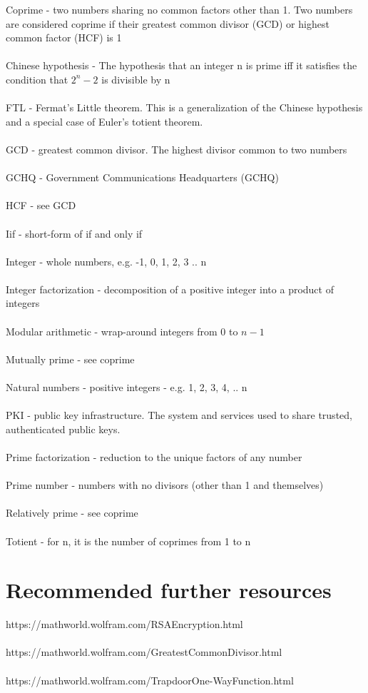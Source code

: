 \documentclass[11pt]{article}   	%
\begin{document}
Coprime - two numbers sharing no common factors other than 1. Two numbers are considered coprime if their greatest common divisor (GCD) or highest common factor (HCF) is 1 \\
\\
Chinese hypothesis - The hypothesis that an integer n is prime iff it satisfies the condition that $ 2^n - 2 $ is divisible by n \\
\\
FTL - Fermat's Little theorem. This is a generalization of the Chinese hypothesis and a special case of Euler's totient theorem. \\
\\
GCD - greatest common divisor. The highest divisor common to two numbers \\
\\
GCHQ - Government Communications Headquarters (GCHQ) \\
\\
HCF - see GCD \\
\\
Iif - short-form of if and only if \\
\\
Integer - whole numbers, e.g. -1, 0, 1, 2, 3 .. n \\
\\
Integer factorization - decomposition of a positive integer into a product of integers \\
\\
Modular arithmetic - wrap-around integers from 0 to $ n - 1 $ \\
\\
Mutually prime - see coprime \\
\\
Natural numbers - positive integers - e.g. 1, 2, 3, 4, .. n \\
\\
PKI - public key infrastructure. The system and services used to share trusted, authenticated public keys. \\
\\
Prime factorization - reduction to the unique factors of any number \\
\\
Prime number - numbers with no divisors (other than 1 and themselves) \\
\\
Relatively prime - see coprime \\
\\
Totient - for n, it is the number of coprimes from 1 to n \\

\break


\section*{Recommended further resources}

https://mathworld.wolfram.com/RSAEncryption.html \\
\\
https://mathworld.wolfram.com/GreatestCommonDivisor.html \\
\\
https://mathworld.wolfram.com/TrapdoorOne-WayFunction.html
\end{document}

